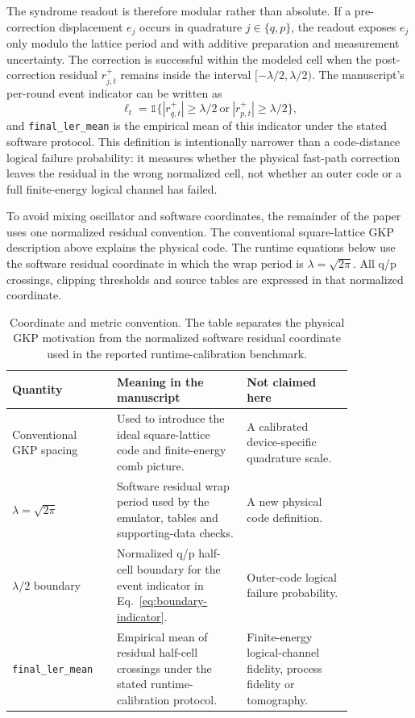 \documentclass[11pt]{article}
\newcommand{\finalLER}{\texttt{final\_ler\_mean}}
\begin{document}
The syndrome readout is therefore modular rather than absolute.  If a
pre-correction displacement \(e_j\) occurs in quadrature \(j\in\{q,p\}\), the
readout exposes \(e_j\) only modulo the lattice period and with additive
preparation and measurement uncertainty.  The correction is successful within
the modeled cell when the post-correction residual
\(r_{j,t}^{+}\) remains inside the interval
\([-\lambda/2,\lambda/2)\).  The manuscript's per-round event indicator can be
written as
\begin{equation}
    \ell_t
    =
    \mathbb{1}\{|r_{q,t}^{+}|\ge \lambda/2\ \mathrm{or}\
    |r_{p,t}^{+}|\ge \lambda/2\},
    \label{eq:boundary-indicator}
\end{equation}
and \finalLER{} is the empirical mean of this indicator under the stated
software protocol.  This definition is intentionally narrower than a
code-distance logical failure probability: it measures whether the physical
fast-path correction leaves the residual in the wrong normalized cell, not
whether an outer code or a full finite-energy logical channel has failed.

To avoid mixing oscillator and software coordinates, the remainder of the paper
uses one normalized residual convention.  The conventional square-lattice GKP
description above explains the physical code.  The runtime equations below use
the software residual coordinate in which the wrap period is
\(\lambda=\sqrt{2\pi}\).  All q/p crossings, clipping thresholds and source
tables are expressed in that normalized coordinate.

\begin{table}[htbp]
\centering
\small
\begin{tabular}{@{}>{\raggedright\arraybackslash}p{0.24\linewidth}>{\raggedright\arraybackslash}p{0.33\linewidth}>{\raggedright\arraybackslash}p{0.27\linewidth}@{}}
\toprule
Quantity & Meaning in the manuscript & Not claimed here \\
\midrule
Conventional GKP spacing & Used to introduce the ideal square-lattice code and
finite-energy comb picture. & A calibrated device-specific quadrature scale. \\
\addlinespace
\(\lambda=\sqrt{2\pi}\) & Software residual wrap period used by the emulator,
tables and supporting-data checks. & A new physical code definition. \\
\addlinespace
\(\lambda/2\) boundary & Normalized q/p half-cell boundary for the event
indicator in Eq.~\eqref{eq:boundary-indicator}. & Outer-code logical failure
probability. \\
\addlinespace
\finalLER{} & Empirical mean of residual half-cell crossings under the stated
runtime-calibration protocol. & Finite-energy logical-channel fidelity,
process fidelity or tomography. \\
\bottomrule
\end{tabular}
\caption{Coordinate and metric convention.  The table separates the physical
GKP motivation from the normalized software residual coordinate used in the
reported runtime-calibration benchmark.}
\label{tab:gkp-coordinate-convention}
\end{table}
\end{document}
